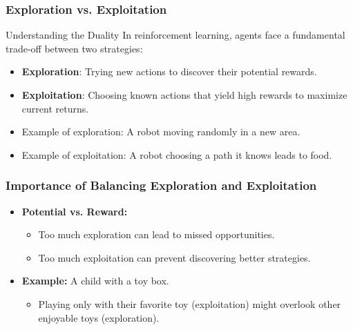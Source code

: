 \documentclass[aspectratio=169]{beamer}
\begin{document}
\begin{frame}[fragile]
    \frametitle{Exploration vs. Exploitation}
    
    \begin{block}{Understanding the Duality}
        In reinforcement learning, agents face a fundamental trade-off between two strategies:
        \begin{itemize}
            \item \textbf{Exploration}: Trying new actions to discover their potential rewards.
            \item \textbf{Exploitation}: Choosing known actions that yield high rewards to maximize current returns.
        \end{itemize}
    \end{block}
    
    \begin{itemize}
        \item Example of exploration: A robot moving randomly in a new area.
        \item Example of exploitation: A robot choosing a path it knows leads to food.
    \end{itemize}
\end{frame}

\begin{frame}[fragile]
    \frametitle{Importance of Balancing Exploration and Exploitation}
    
    \begin{itemize}
        \item \textbf{Potential vs. Reward:} 
        \begin{itemize}
            \item Too much exploration can lead to missed opportunities.
            \item Too much exploitation can prevent discovering better strategies.
        \end{itemize}

        \item \textbf{Example:} A child with a toy box.
        \begin{itemize}
            \item Playing only with their favorite toy (exploitation) might overlook other enjoyable toys (exploration).
        \end{itemize}
    \end{itemize}
\end{frame}
\end{document}
